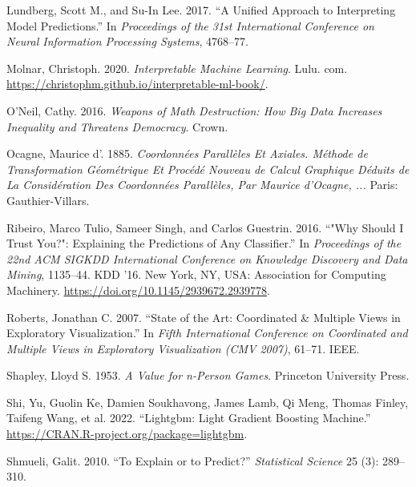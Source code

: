 \documentclass[11pt,twoside]{article}
\newlength{\cslhangindent}
\newlength{\cslentryspacingunit} %
\newenvironment{CSLReferences}[2] %
 {%
  \setlength{\parindent}{0pt}
  \ifodd #1
  \let\oldpar\par
  \def\par{\hangindent=\cslhangindent\oldpar}
  \fi
  \setlength{\parskip}{#2\cslentryspacingunit}
 }%
 {}
\begin{document}
\begin{CSLReferences}{1}{0}
\leavevmode{}%
Lundberg, Scott M., and Su-In Lee. 2017. {``A Unified Approach to Interpreting Model Predictions.''} In \emph{Proceedings of the 31st International Conference on Neural Information Processing Systems}, 4768--77.

\leavevmode{}%
Molnar, Christoph. 2020. \emph{Interpretable Machine Learning}. Lulu. com. \url{https://christophm.github.io/interpretable-ml-book/}.

\leavevmode{}%
O'Neil, Cathy. 2016. \emph{Weapons of Math Destruction: {How} Big Data Increases Inequality and Threatens Democracy}. Crown.

\leavevmode{}%
Ocagne, Maurice d'. 1885. \emph{Coordonnées Parallèles Et Axiales. {Méthode} de Transformation Géométrique Et Procédé Nouveau de Calcul Graphique Déduits de La Considération Des Coordonnées Parallèles, Par {Maurice} d'{Ocagne}, ...} Paris: Gauthier-Villars.

\leavevmode{}%
Ribeiro, Marco Tulio, Sameer Singh, and Carlos Guestrin. 2016. {``"{Why} {Should} {I} {Trust} {You}?": {Explaining} the {Predictions} of {Any} {Classifier}.''} In \emph{Proceedings of the 22nd {ACM} {SIGKDD} {International} {Conference} on {Knowledge} {Discovery} and {Data} {Mining}}, 1135--44. {KDD} '16. New York, NY, USA: Association for Computing Machinery. \url{https://doi.org/10.1145/2939672.2939778}.

\leavevmode{}%
Roberts, Jonathan C. 2007. {``State of the Art: {Coordinated} \& Multiple Views in Exploratory Visualization.''} In \emph{Fifth International Conference on Coordinated and Multiple Views in Exploratory Visualization ({CMV} 2007)}, 61--71. IEEE.

\leavevmode{}%
Shapley, Lloyd S. 1953. \emph{A Value for n-Person Games}. Princeton University Press.

\leavevmode{}%
Shi, Yu, Guolin Ke, Damien Soukhavong, James Lamb, Qi Meng, Thomas Finley, Taifeng Wang, et al. 2022. {``Lightgbm: {Light} {Gradient} {Boosting} {Machine}.''} \url{https://CRAN.R-project.org/package=lightgbm}.

\leavevmode{}%
Shmueli, Galit. 2010. {``To Explain or to Predict?''} \emph{Statistical Science} 25 (3): 289--310.


\end{CSLReferences}
\end{document}

